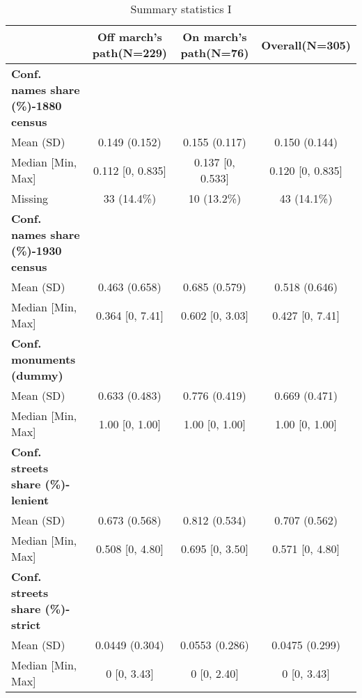 \begin{table}[h]

\caption{\label{tab:desc_stat_names}Summary statistics I}
\centering
\fontsize{8}{10}\selectfont
\begin{tabular}[t]{>{}lccc}
\toprule
 & Off march's path(N=229) & On march's path(N=76) & Overall(N=305)\\
\midrule
\textbf{Conf. names share (\%)-1880 census} &  &  & \\
Mean (SD) & 0.149 (0.152) & 0.155 (0.117) & 0.150 (0.144)\\
Median [Min, Max] & 0.112 [0, 0.835] & 0.137 [0, 0.533] & 0.120 [0, 0.835]\\
Missing & 33 (14.4\%) & 10 (13.2\%) & 43 (14.1\%)\\
\addlinespace
\textbf{Conf. names share (\%)-1930 census} &  &  & \\
Mean (SD) & 0.463 (0.658) & 0.685 (0.579) & 0.518 (0.646)\\
Median [Min, Max] & 0.364 [0, 7.41] & 0.602 [0, 3.03] & 0.427 [0, 7.41]\\
\addlinespace
\textbf{Conf. monuments (dummy)} &  &  & \\
Mean (SD) & 0.633 (0.483) & 0.776 (0.419) & 0.669 (0.471)\\
Median [Min, Max] & 1.00 [0, 1.00] & 1.00 [0, 1.00] & 1.00 [0, 1.00]\\
\addlinespace
\textbf{Conf. streets share (\%)-lenient} &  &  & \\
Mean (SD) & 0.673 (0.568) & 0.812 (0.534) & 0.707 (0.562)\\
Median [Min, Max] & 0.508 [0, 4.80] & 0.695 [0, 3.50] & 0.571 [0, 4.80]\\
\addlinespace
\textbf{Conf. streets share (\%)-strict} &  &  & \\
Mean (SD) & 0.0449 (0.304) & 0.0553 (0.286) & 0.0475 (0.299)\\
Median [Min, Max] & 0 [0, 3.43] & 0 [0, 2.40] & 0 [0, 3.43]\\
\bottomrule
\end{tabular}
\end{table}
